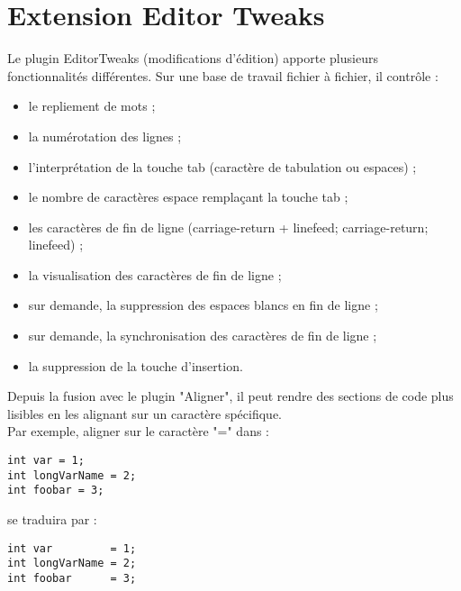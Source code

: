 \section{Extension Editor Tweaks}\label{sec:editor_tweaks}

Le plugin EditorTweaks (modifications d'édition) apporte plusieurs fonctionnalités différentes. Sur une base de travail fichier à fichier, il contrôle :

\begin{itemize}
\item le repliement de mots ;
\item la numérotation des lignes ;
\item l'interprétation de la touche tab (caractère de tabulation ou espaces) ;
\item le nombre de caractères espace remplaçant la touche tab ;
\item les caractères de fin de ligne (carriage-return + linefeed; carriage-return; linefeed) ;
\item la visualisation des caractères de fin de ligne ;
\item sur demande, la suppression des espaces blancs en fin de ligne ;
\item sur demande, la synchronisation des caractères de fin de ligne ;
\item la suppression de la touche d'insertion.
\end{itemize}

Depuis la fusion avec le plugin "Aligner", il peut rendre des sections de code plus lisibles en les alignant sur un caractère spécifique.\\Par exemple, aligner sur le caractère "=" dans :

\begin{lstlisting}
int var = 1;
int longVarName = 2;
int foobar = 3;
\end{lstlisting}

se traduira par :

\begin{lstlisting}
int var         = 1;
int longVarName = 2;
int foobar      = 3;
\end{lstlisting}
